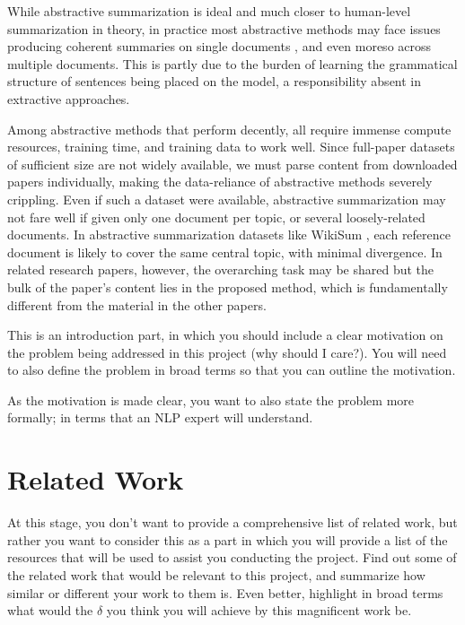 \documentclass[conference]{sig-alternate-05-2015}
\begin{document}
While abstractive summarization is ideal and much closer to human-level summarization in theory, in practice most 
abstractive methods may face issues producing coherent summaries on single documents \cite{mds2017}, and even moreso 
across multiple documents. This is partly due to the burden of learning the grammatical structure of sentences being 
placed on the model, a responsibility absent in extractive approaches. 

Among abstractive methods that perform decently, all require 
immense compute resources, training time, and training data to work well. Since full-paper datasets of sufficient size are not 
widely available, we must parse content from downloaded papers individually, making the data-reliance of abstractive 
methods severely crippling. Even if such a dataset were available, abstractive summarization may not fare well if given 
only one document per topic, or several loosely-related documents. In abstractive summarization datasets like WikiSum \cite{wikisum}, 
each reference document is likely to cover the same central topic, with minimal divergence. In related research papers, however, the overarching task 
may be shared but the bulk of the paper's content lies in the proposed method, which is fundamentally different from the 
material in the other papers.

This is an introduction part, in which you should include a clear motivation on the problem being addressed in this project (why should I care?). You will need to also define the problem in broad terms so that you can outline the motivation. 

As the motivation is made clear, you want to also state the problem more formally; in terms that an NLP expert will understand. 


\section{Related Work}\label{sec:related}
At this stage, you don't want to provide a comprehensive list of related work, but rather you want to consider this as a part in which you will provide a list of the resources that will be used to assist you conducting the project. Find out some of the related work that would be relevant to this project, and summarize how similar or different your work to them is. Even better, highlight in broad terms what would the $\delta$ you think you will achieve by this magnificent work be. 

\end{document}
